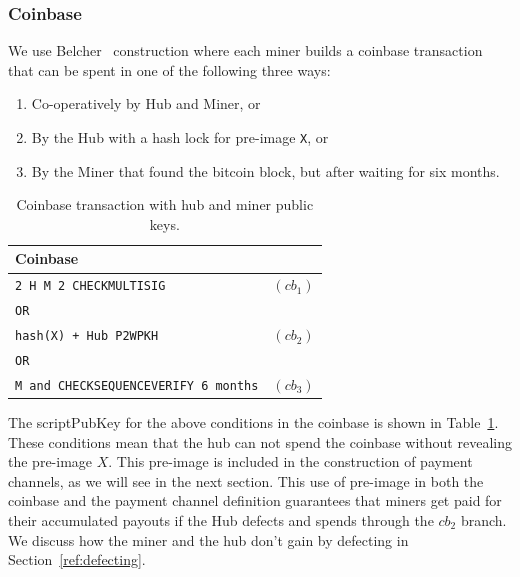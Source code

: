 \documentclass{article}
\begin{document}


\subsubsection{Coinbase}

We use Belcher~\cite{channels-for-rewards} construction where each
miner builds a coinbase transaction that can be spent in one of the
following three ways:

\begin{enumerate}
\item Co-operatively by Hub and Miner, or
\item By the Hub with a hash lock for pre-image \verb|X|, or
\item By the Miner that found the bitcoin block, but after waiting for
  six months.
\end{enumerate}

\begin{table}
  \centering
  \begin{tabular}{ lr }
    \bfseries Coinbase \\
    \midrule
    \verb|2 H M 2 CHECKMULTISIG| & $(cb_1)$ \\
    \verb|OR| \\
    \verb|hash(X) + Hub P2WPKH| & $(cb_2)$ \\
    \verb|OR| \\
    \verb|M and CHECKSEQUENCEVERIFY 6 months| & $(cb_3)$\\ 
    \midrule
  \end{tabular}
  \caption{Coinbase transaction with hub and miner public keys.}\label{table:coinbase}
\end{table}

The scriptPubKey for the above conditions in the coinbase is shown in
Table~\ref{table:coinbase}. These conditions mean that the hub can not
spend the coinbase without revealing the pre-image $X$. This pre-image
is included in the construction of payment channels, as we will see in
the next section. This use of pre-image in both the coinbase and the
payment channel definition guarantees that miners get paid for their
accumulated payouts if the Hub defects and spends through the $cb_2$
branch. We discuss how the miner and the hub don't gain by defecting
in Section~\ref{ref:defecting}.
\end{document}
